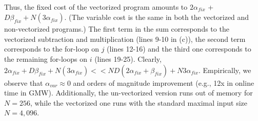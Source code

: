 Thus, the fixed cost of the vectorized program amounts to
$2\alpha_\mathit{fix}$ + $D \beta_\mathit{fix} + N(3\alpha_\mathit{fix})$. (The variable cost is the same in both the vectorized and non-vectorized programs.)
The first term in the sum corresponds to the vectorized
subtraction and multiplication (lines 9-10 in (c)), the second term corresponds to the for-loop on $j$ (lines 12-16) and the third
one corresponds to the remaining for-loops on $i$ (lines 19-25). 
Clearly, $2\alpha_\mathit{fix} + D\beta_\mathit{fix} + N(3\alpha_\mathit{fix}) << ND(2\alpha_\mathit{fix}+\beta_\mathit{fix}) + N3\alpha_\mathit{fix}$.
Empirically, we observe that $\alpha_\mathit{var} \approx 0$ and orders of magnitude improvement (e.g., 12x in online time in GMW). 
Additionally, the un-vectorized version runs out of memory for $N=256$, while the vectorized one runs with the standard maximal input 
size $N=4,096$.
